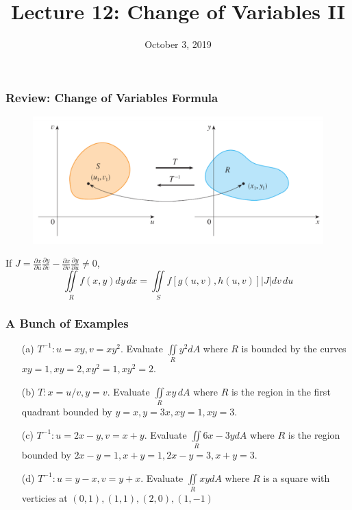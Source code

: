 \documentclass{beamer}
\title{Lecture 12: Change of Variables II}
\date{October 3, 2019}
\begin{document}
	
\frame{\titlepage}


\begin{frame}
\frametitle{Review: Change of Variables Formula}
\begin{figure}
	
	\includegraphics[height=.5\textheight]{vmap.png}\\
	\hspace*{10pt}\hbox{}
\end{figure}
If $J = \frac{\partial x}{\partial u} \frac{\partial y}{\partial v}-	\frac{\partial x}{\partial v}\frac{\partial y}{\partial u} \neq 0$,
$$\iint\limits_{R} f(x,y)dy\,dx = \iint\limits_{S} f[g(u,v),h(u,v)] |J| dv\,du$$


\end{frame}

\begin{frame}
\frametitle{A Bunch of Examples}

\begin{itemize}
	\item[(a)] $T^{-1}: u=xy,v=xy^2$. Evaluate $\iint\limits_{R} y^2 dA$ where $R$ is bounded by the curves $xy=1,xy=2,xy^2=1,xy^2=2$.
	\item[(b)]$T: x=u/v, y=v$. Evaluate $\iint\limits_{R} xy \,dA$ where $R$ is the region in the first quadrant bounded by $y=x,y=3x,xy=1,xy=3$.
	\item[(c)]$T^{-1}: u=2x-y,v=x+y$. Evaluate $\iint\limits_{R} 6x-3y dA$ where $R$ is the region bounded by $2x-y=1,x+y=1,2x-y=3,x+y=3$.
	\item[(d)]$T^{-1}: u=y-x,v=y+x$. Evaluate $\iint\limits_{R} xy dA$ where $R$ is a square with verticies at $(0,1),(1,1),(2,0),(1,-1)$
\end{itemize}
\end{frame}
\end{document}
